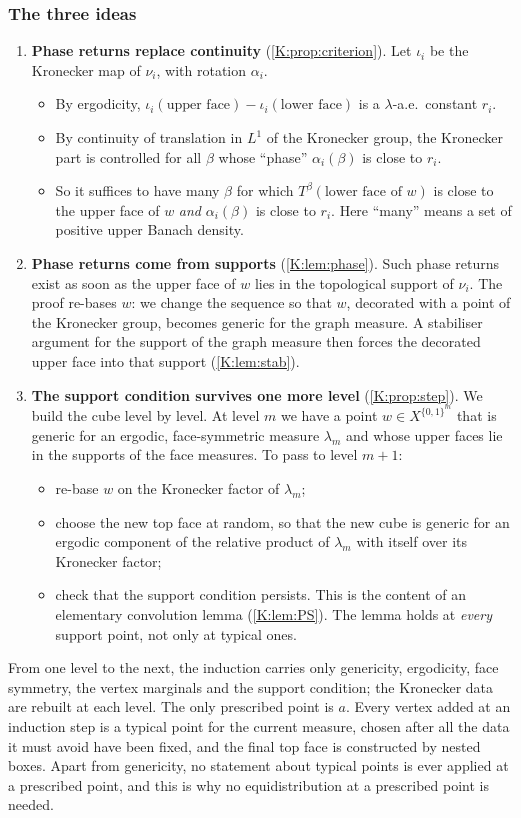 \subsubsection*{The three ideas}
\begin{enumerate}[label=(\roman*)]
\item \textbf{Phase returns replace continuity} (\cref{K:prop:criterion}).
Let $\iota_i$ be the Kronecker map of $\nu_i$, with rotation $\alpha_i$.
\begin{itemize}
\item By ergodicity, $\iota_i(\text{upper face})-\iota_i(\text{lower face})$ is a
$\lambda$-a.e.\ constant $r_i$.
\item By continuity of translation in $L^1$ of the Kronecker group, the Kronecker part
is controlled for all $\beta$ whose ``phase'' $\alpha_i(\beta)$ is close to $r_i$.
\item So it suffices to have many $\beta$ for which $T^\beta(\text{lower face of }w)$ is close
to the upper face of $w$ \emph{and} $\alpha_i(\beta)$ is close to $r_i$. Here ``many'' means
a set of positive upper Banach density.
\end{itemize}
\item \textbf{Phase returns come from supports} (\cref{K:lem:phase}).
Such phase returns exist as soon as the upper face of $w$ lies in the topological support
of $\nu_i$. The proof re-bases $w$: we change the \Fol{} sequence so that $w$, decorated
with a point of the Kronecker group, becomes generic for the graph measure. A stabiliser
argument for the support of the graph measure then forces the decorated upper face into
that support (\cref{K:lem:stab}).
\item \textbf{The support condition survives one more level} (\cref{K:prop:step}).
We build the cube level by level. At level $m$ we have a point $w\in X^{\{0,1\}^m}$ that
is generic for an ergodic, face-symmetric measure $\lambda_m$ and whose upper faces lie in
the supports of the face measures. To pass to level $m+1$:
\begin{itemize}
\item re-base $w$ on the Kronecker factor of $\lambda_m$;
\item choose the new top face at random, so that the new cube is generic for an ergodic
component of the relative product of $\lambda_m$ with itself over its Kronecker factor;
\item check that the support condition persists. This is the content of an elementary
convolution lemma (\cref{K:lem:PS}). The lemma holds at \emph{every} support point, not
only at typical ones.
\end{itemize}
\end{enumerate}
From one level to the next, the induction carries only genericity, ergodicity, face
symmetry, the vertex marginals and the support condition; the Kronecker data are rebuilt at
each level.
The only prescribed point is $a$. Every vertex added at an induction step is a typical
point for the current measure, chosen after all the data it must avoid have been fixed, and
the final top face is constructed by nested boxes. Apart from genericity, no statement
about typical points is ever applied at a prescribed point, and this is why no
equidistribution at a prescribed point is needed.

